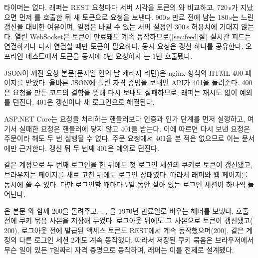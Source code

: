  타이머는 없다. 래퍼는 REST 요청마다 서버 시각을 토큰의 와 비교하고, 720\,s가 지났으면 먼저 를 호출한 뒤 새 토큰으로 요청을 보낸다. 900\,s 만료 전에 남는 180\,s는 느린 갱신을 대비한 여유이며, 일정은 바뀔 수 있는 서버 설정인 300\,s 허용치에 기대지 않는다. 열린 WebSocket은 토큰이 만료돼도 계속 동작하므로(\ref{sec:feed}절) 실시간 피드는 연결하거나 다시 연결할 때만 토큰이 필요하다. 동시 요청은 갱신 하나를 공유한다. 오프라인 테스트에서 토큰을 동시에 5번 요청하자 는 1번 호출됐다.

 JSON이 깨진 요청 본문(문자열 안의 날 캐리지 리턴)은 nginx 형식의 HTML 400 페이지를 받았다. 올바른 JSON에 틀린 자격 증명을 보내면 API가 401을 돌려준다. 400은 요청을 만든 코드의 결함을 뜻해 다시 보내도 실패하므로, 래퍼는 재시도 없이 예외를 던진다. 401은 갱신이나 새 로그인으로 해결된다.

 ASP.NET Core는 요청을 처리하는 핸들러보다 인증과 인가 단계를 먼저 실행하고, 여기서 실패한 요청은 핸들러에 닿지 않고 401을 받는다. 이에 따르면 다시 보낸 요청은 주문이라 해도 두 번 실행될 수 없다. 주문 요청에서 401을 본 적은 없으므로 이는 문서에만 근거한다. 갱신 뒤 두 번째 401은 예외로 던진다.

 같은 계정으로 두 번째 로그인을 한 뒤에도 첫 로그인 세션의 쿠키로 토큰이 갱신됐고, 브라우저는 페이지를 새로 고친 뒤에도 로그인 상태였다. 따라서 래퍼와 웹 페이지를 동시에 쓸 수 있다. 다만 로그인할 때마다 7일 동안 살아 있는 로그인 세션이 하나씩 늘어난다.

 은 본문 \code{{}}와 함께 200을 돌려주고, , , 을 1970년 만료일로 비우는  헤더를 보냈다. 호출 전에 쿠키 묶음 사본을 저장해 두었다. 로그아웃 뒤에도 그 사본으로 토큰이 갱신됐고( 200), 로그아웃 전에 발급된 액세스 토큰도 REST에서 계속 동작했으며(200), 같은 계정의 다른 로그인 세션 2개도 계속 동작했다. 따라서 저장된 쿠키 묶음은 브라우저에서 무슨 일이 있든 7일짜리 자격 증명으로 동작하며, 래퍼는 이를 전제로 설계됐다.

